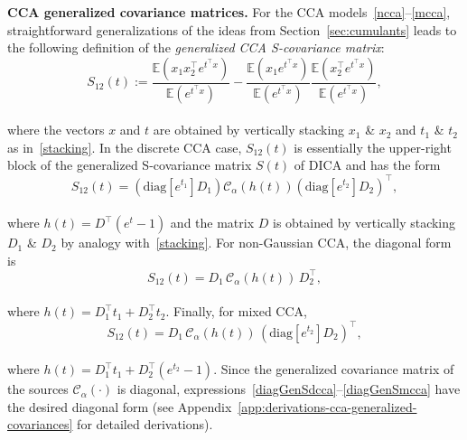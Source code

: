 \documentclass{article}
\newcommand{\ppp}{\textbf}
\newcommand{\one}{1}
\newcommand{\Rra}[1]{\left(#1\right)}
\newcommand{\rbra}[1]{\left(#1\right)}
\newcommand{\diag}{\mathrm{diag}}
\newcommand{\ebb}{\mathbb{E}}
\newcommand{\ccal}{\mathcal{C}}
\begin{document}
\ppp{CCA generalized covariance matrices.} 
For the CCA models~\eqref{ncca}--\eqref{mcca}, straightforward generalizations of the ideas from Section~\ref{sec:cumulants} leads to the following definition of the \emph{generalized CCA S-covariance matrix}:
\\[-1.4em]
\begin{equation}\label{GenSdcca}
S_{12}(t) := \frac{ \ebb ({ x_1x_2^{\top} e^{t^{\top} x} }) }{ \ebb ({ e^{ t^{\top} x } }) } - 
\frac{ \ebb( x_1 e^{t^{\top} x} ) }{ \ebb( e^{t^{\top} x} ) } \frac{ \ebb( x_2^{\top} e^{t^{\top} x} ) }{ \ebb( e^{t^{\top} x} ) },
\end{equation}
\\[-1.4em]
where the vectors $x$ and $t$ are obtained by vertically stacking $x_1$ \& $x_2$ and $t_1$ \& $t_2$ as in~\eqref{stacking}. In the discrete CCA case, $S_{12}(t)$ is essentially the upper-right block of the generalized S-covariance matrix $S(t)$ of DICA and has the form 
\\[-1.4em]
\begin{equation}\label{diagGenSdcca}
S_{12}(t) = \Rra{\diag[e^{t_1}]D_1} \ccal_{\alpha}({ h(t) }) \Rra{ \diag[ e^{t_2}]D_2 }^{\top},
\end{equation}
\\[-1.4em]
where $h(t)=D^{\top}(e^t - \one)$ and the matrix $D$ is obtained by vertically stacking $D_1$ \& $D_2$ by analogy with~\eqref{stacking}.
For non-Gaussian CCA, the diagonal form is
\\[-0.8em]
\begin{equation}\label{diagGenSncca}
S_{12}(t) = D_1 \, \ccal_{\alpha} \rbra{{ h(t) }} \, D_2^{\top},
\end{equation} 
\\[-1.0em]
where $h(t) = D_1^{\top}t_1 + D_2^{\top}t_2$. 
Finally, for mixed CCA,
\\[-0.8em]
\begin{equation}\label{diagGenSmcca}
S_{12}(t) = D_1  \, \ccal_{\alpha} \rbra{{ h(t) }} \, \Rra{ \diag[e^{t_2}]D_2 }^{\top},
\end{equation}
\\[-1.0em]
where $h(t) = D_1^{\top}t_1 + D_2^{\top} (e^{t_2}-\one)$.
Since the generalized covariance matrix of the sources $\ccal_{\alpha}(\cdot)$ is diagonal, expressions~\eqref{diagGenSdcca}--\eqref{diagGenSmcca} have the desired diagonal form (see Appendix~\ref{app:derivations-cca-generalized-covariances} for detailed derivations).
\end{document}
